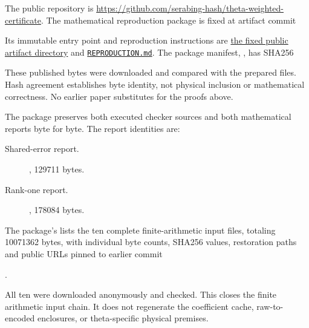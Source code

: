 \documentclass[11pt,a4paper]{article}
\theoremstyle{definition}
\theoremstyle{remark}
\numberwithin{equation}{section}
\begin{document}
The public repository is
\url{https://github.com/serabing-hash/theta-weighted-certificate}.
The mathematical reproduction package is fixed at artifact commit
\begin{center}\small{}\end{center}
Its immutable entry point and reproduction instructions are
\href{https://github.com/serabing-hash/theta-weighted-certificate/tree/7429e208b0bea64f09102c21d0e97ded76788f86/research/2026-10-20-inverse-response}{the fixed public artifact directory} and
\href{https://github.com/serabing-hash/theta-weighted-certificate/blob/7429e208b0bea64f09102c21d0e97ded76788f86/research/2026-10-20-inverse-response/REPRODUCTION.md}{\texttt{REPRODUCTION.md}}.
The package manifest, , has SHA256
\begin{center}\small{}\end{center}
These published bytes were downloaded and compared with the prepared
files. Hash agreement establishes byte identity, not physical inclusion
or mathematical correctness. No earlier paper substitutes for the
proofs above.

The package preserves both executed checker sources and both mathematical
reports byte for byte. The report identities are:
\begin{description}
\item[Shared-error report.] , 129711 bytes.
\par{}
\item[Rank-one report.] , 178084 bytes.
\par{}
\end{description}
The package's  lists the ten complete finite-arithmetic
input files, totaling 10071362 bytes, with individual byte counts,
SHA256 values, restoration paths and public URLs pinned to earlier commit
\begin{center}\small{}.\end{center}
All ten were downloaded anonymously and checked. This closes the finite
arithmetic input chain. It does not regenerate the coefficient cache,
raw-to-encoded enclosures, or theta-specific physical premises.
\end{document}
